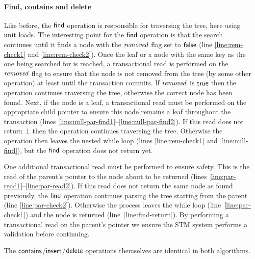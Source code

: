 \paragraph{Find, contains and delete}
Like before, the $\act{find}$ operation is responsible for traversing the tree, here using unit loads.
The interesting point for the $\act{find}$ operation is that the search continues until it finds a node with the $\ms{removed}$ flag set to $\lit{false}$
(line \ref{line:rem-check1} and \ref{line:rem-check2}).
Once the leaf or a node with the same key as the one being searched for is reached, a transactional read is performed on the $\ms{removed}$ flag to
ensure that the node is not removed from the tree (by some other operation) at least until the transaction commits.
If $\ms{removed}$ is $\lit{true}$ then the operation continues traversing the tree, otherwise 
the correct node has been found.
Next, if the node is a leaf, a transactional read must be performed on the appropriate child pointer to ensure this node remains a leaf throughout
the transaction (lines \ref{line:null-par-find1}--\ref{line:null-par-find2}).
If this read does not return $\bot$ then the operation continues traversing the tree.
Otherwise the operation then leaves the nested while loop 
(lines \ref{line:rem-check1} and \ref{line:null-find}), but the $\act{find}$ operation does not return yet.

One additional transactional read must be performed to ensure safety.
This is the read of the parent's pointer to the node about to be returned (lines \ref{line:par-read1}--\ref{line:par-read2}).
If this read does not return the same node as found previously, the $\act{find}$ operation continues parsing the tree 
starting from the parent (line \ref{line:par-check2}).
Otherwise the process leaves the while loop (line~\ref{line:par-check1}) and the node is returned (line~\ref{line:find-return}).
By performing a transactional read on the parent's pointer we ensure the STM system performs a validation before continuing.

The $\act{contains}$/$\act{insert}$/$\act{delete}$ operations themselves are identical in both algorithms.

